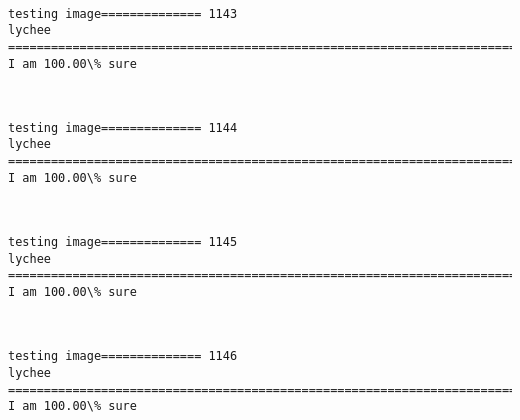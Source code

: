 \documentclass[11pt]{article}
\begin{document}
    \begin{center}
    \end{center}
    { \hspace*{\fill} \\}
    
    \begin{Verbatim}[commandchars=\\\{\}]
testing image============== 1143
lychee
============================================================================
I am 100.00\% sure

    \end{Verbatim}

    \begin{center}
    \end{center}
    { \hspace*{\fill} \\}
    
    \begin{Verbatim}[commandchars=\\\{\}]
testing image============== 1144
lychee
============================================================================
I am 100.00\% sure

    \end{Verbatim}

    \begin{center}
    \end{center}
    { \hspace*{\fill} \\}
    
    \begin{Verbatim}[commandchars=\\\{\}]
testing image============== 1145
lychee
============================================================================
I am 100.00\% sure

    \end{Verbatim}

    \begin{center}
    \end{center}
    { \hspace*{\fill} \\}
    
    \begin{Verbatim}[commandchars=\\\{\}]
testing image============== 1146
lychee
============================================================================
I am 100.00\% sure

    \end{Verbatim}
\end{document}
